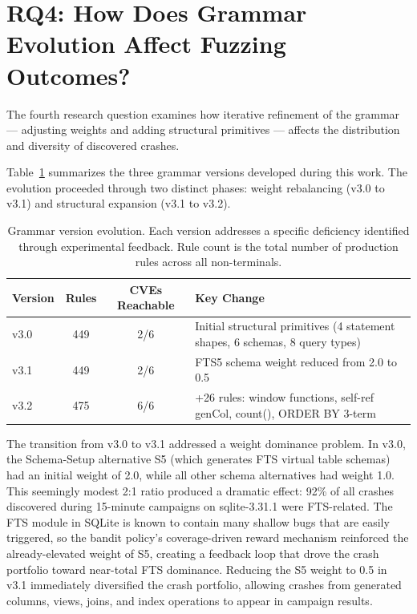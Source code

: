 \section{RQ4: How Does Grammar Evolution Affect Fuzzing Outcomes?}
\label{sec:rq4}

The fourth research question examines how iterative refinement of the grammar --- adjusting weights and adding structural primitives --- affects the distribution and diversity of discovered crashes.

Table~\ref{tab:grammar-evolution-rq4} summarizes the three grammar versions developed during this work. The evolution proceeded through two distinct phases: weight rebalancing (v3.0 to v3.1) and structural expansion (v3.1 to v3.2).

\begin{table}[htbp]
\caption{Grammar version evolution. Each version addresses a specific deficiency identified through experimental feedback. Rule count is the total number of production rules across all non-terminals.}
\label{tab:grammar-evolution-rq4}
\centering
\begin{tabular}{lccp{6cm}}
\toprule
\textbf{Version} & \textbf{Rules} & \textbf{CVEs Reachable} & \textbf{Key Change} \\
\midrule
v3.0 & 449 & 2/6 & Initial structural primitives (4 statement shapes, 6 schemas, 8 query types) \\
v3.1 & 449 & 2/6 & FTS5 schema weight reduced from 2.0 to 0.5 \\
v3.2 & 475 & 6/6 & +26 rules: window functions, self-ref genCol, count(), ORDER BY 3-term \\
\bottomrule
\end{tabular}
\end{table}

The transition from v3.0 to v3.1 addressed a weight dominance problem. In v3.0, the Schema-Setup alternative S5 (which generates FTS virtual table schemas) had an initial weight of 2.0, while all other schema alternatives had weight 1.0. This seemingly modest 2:1 ratio produced a dramatic effect: 92\% of all crashes discovered during 15-minute campaigns on sqlite-3.31.1 were FTS-related. The FTS module in SQLite is known to contain many shallow bugs that are easily triggered, so the bandit policy's coverage-driven reward mechanism reinforced the already-elevated weight of S5, creating a feedback loop that drove the crash portfolio toward near-total FTS dominance. Reducing the S5 weight to 0.5 in v3.1 immediately diversified the crash portfolio, allowing crashes from generated columns, views, joins, and index operations to appear in campaign results.

